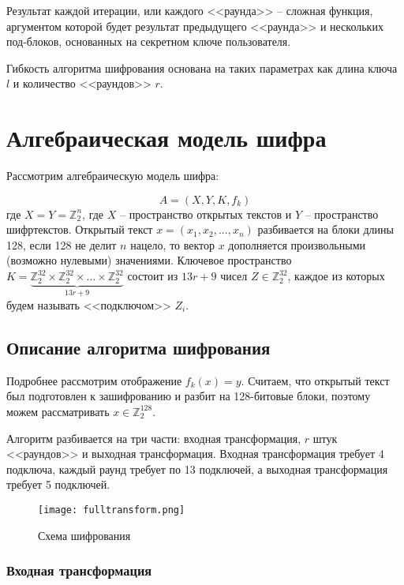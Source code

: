 \documentclass[12pt, a4paper]{article}
\begin{document}
Результат каждой итерации, или каждого <<раунда>> -- сложная функция, аргументом которой будет результат предыдущего <<раунда>> и нескольких под-блоков, основанных на секретном ключе пользователя. 

Гибкость алгоритма шифрования основана на таких параметрах как длина ключа $l$ и количество <<раундов>> $r$.

\section{Алгебраическая модель шифра}

Рассмотрим алгебраическую модель шифра:

\begin{equation}
A = \left(X, Y, K, f_k \right)
\end{equation}
где $X = Y = \mathds{Z}_2^n$, где $X$ -- пространство открытых текстов и $Y$ -- пространство шифртекстов. Открытый текст $x = \left(x_1, x_2, ..., x_n\right)$ разбивается на блоки длины 128, если 128 не делит $n$ нацело, то вектор $x$ дополняется произвольными (возможно нулевыми) значениями. Ключевое пространство $K = \underbrace{\mathds{Z}_2^{32} \times \mathds{Z}_2^{32} \times ... \times \mathds{Z}_2^{32}}_{13r + 9}$ состоит из $13r + 9$ чисел $Z \in \mathds{Z}_2^{32}$, каждое из которых будем называть <<подключом>> $Z_i$.

\subsection{Описание алгоритма шифрования}

Подробнее рассмотрим отображение $f_k(x) = y$. Считаем, что открытый текст был подготовлен к зашифрованию и разбит на 128-битовые блоки, поэтому можем рассматривать $x \in \mathds{Z}_2^{128}$.

Алгоритм разбивается на три части: входная трансформация, $r$ штук <<раундов>> и выходная трансформация.  Входная трансформация требует 4 подключа, каждый раунд требует по 13 подключей, а выходная трансформация требует 5 подключей.

\begin{figure}[h] 
\label{pic:2} \centering
\texttt{[image: fulltransform.png]}
\caption{Схема шифрования}
\end{figure}

\subsubsection{Входная трансформация}
\end{document}
